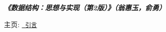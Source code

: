 {\itshape {\bfseries{《数据结构：思想与实现（第2版）》（翁惠玉，俞勇）}}}

主页\+: \href{https://grwei.github.io/data-structure-homework/DS_Ch1/doc/html/index.html}{\texttt{ 引言}} 